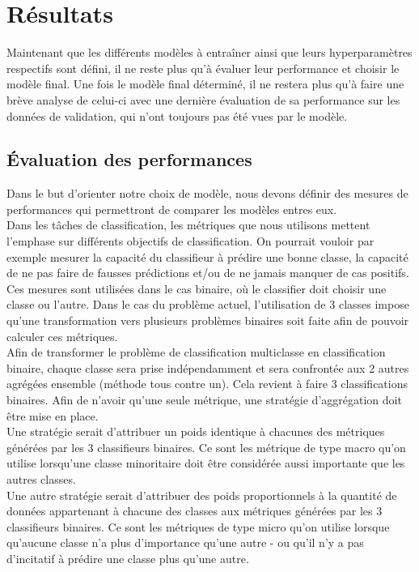 \section{Résultats}
Maintenant que les différents modèles à entraîner ainsi que leurs hyperparamètres respectifs sont défini, il ne reste plus qu'à évaluer leur performance et choisir le modèle final. Une fois le modèle final déterminé, il ne restera plus qu'à faire une brève analyse de celui-ci avec une dernière évaluation de sa performance sur les données de validation, qui n'ont toujours pas été vues par le modèle.  


\subsection{Évaluation des performances}
Dans le but d'orienter notre choix de modèle, nous devons définir des mesures de performances qui permettront de comparer les modèles entres eux. \\

Dans les tâches de classification, les métriques que nous utilisons mettent l'emphase sur différents objectifs de classification. On pourrait vouloir par exemple mesurer la capacité du classifieur à prédire une bonne classe, la capacité de ne pas faire de fausses prédictions et/ou de ne jamais manquer de cas positifs. Ces mesures sont utilisées dans le cas binaire, où le classifier doit choisir une classe ou l'autre. Dans le cas du problème actuel, l'utilisation de 3 classes impose qu'une transformation vers plusieurs problèmes binaires soit faite afin de pouvoir calculer ces métriques. \\

Afin de transformer le problème de classification multiclasse en classification binaire, chaque classe sera prise indépendamment et sera confrontée aux 2 autres agrégées ensemble (méthode tous contre un). Cela revient à faire 3 classifications binaires. Afin de n'avoir qu'une seule métrique, une stratégie d'aggrégation doit être mise en place. \\ Une stratégie serait d'attribuer un poids identique à chacunes des métriques générées par les 3 classifieurs binaires. Ce sont les métrique de type macro qu'on utilise lorsqu'une classe minoritaire doit être considérée aussi importante que les autres classes. \\ Une autre stratégie serait d'attribuer des poids proportionnels à la quantité de données appartenant à chacune des classes aux métriques générées par les 3 classifieurs binaires. Ce sont les métriques de type micro qu'on utilise lorsque qu'aucune classe n'a plus d'importance qu'une autre - ou qu'il n'y a pas d'incitatif à prédire une classe plus qu'une autre. \\

